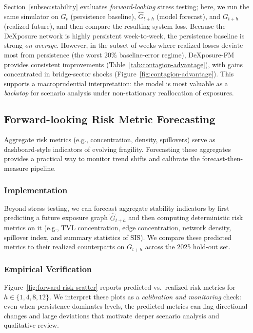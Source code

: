 Section~\ref{subsec:stability} evaluates \emph{forward-looking} stress testing; here, we run the same simulator on $G_t$ (persistence baseline), $\hat{G}_{t+h}$ (model forecast), and $G_{t+h}$ (realized future), and then compare the resulting system loss. Because the DeXposure network is highly persistent week-to-week, the persistence baseline is strong \emph{on average}. However, in the subset of weeks where realized losses deviate most from persistence (the worst 20\% baseline-error regime), DeXposure-FM provides consistent improvements (Table~\ref{tab:contagion-advantage}), with gains concentrated in bridge-sector shocks (Figure~\ref{fig:contagion-advantage}). This supports a macroprudential interpretation: the model is most valuable as a \emph{backstop} for scenario analysis under non-stationary reallocation of exposures.

\subsection{Forward-looking Risk Metric Forecasting}
\label{subsubsec:forward-looking-risk}

Aggregate risk metrics (e.g., concentration, density, spillovers) serve as dashboard-style indicators of evolving fragility. Forecasting these aggregates provides a practical way to monitor trend shifts and calibrate the forecast-then-measure pipeline.

\subsubsection{Implementation} 

Beyond stress testing, we can forecast aggregate stability indicators by first predicting a future exposure graph $\hat{G}_{t+h}$ and then computing deterministic risk metrics on it (e.g., TVL concentration, edge concentration, network density, spillover index, and summary statistics of SIS). We compare these predicted metrics to their realized counterparts on $G_{t+h}$ across the 2025 hold-out set.

\subsubsection{Empirical Verification}

Figure~\ref{fig:forward-risk-scatter} reports predicted vs.\ realized risk metrics for $h\in\{1,4,8,12\}$. We interpret these plots as a \emph{calibration and monitoring} check: even when persistence dominates levels, the predicted metrics can flag directional changes and large deviations that motivate deeper scenario analysis and qualitative review.

